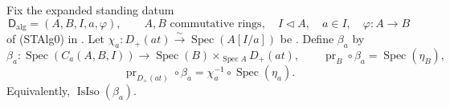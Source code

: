 \begin{lemma}
  \label{lemma:nagata-strict-transform-basechange-chart}

  Fix the expanded standing datum
  \[
    \mathsf D_{\mathrm{alg}}=(A,B,I,a,\varphi),\qquad
    A,B\text{ commutative rings},\quad
    I\triangleleft A,\quad a\in I,\quad
    \varphi\colon A\to B
  \]
  of (STAlg0) in
  .
  Let $\chi_a\colon D_+(at)\xrightarrow{\sim}
  \operatorname{Spec}(A[I/a])$ be
  .  Define $\beta_a$ by
  \[
    \beta_a\colon\operatorname{Spec}(C_a(A,B,I))
      \longrightarrow
      \operatorname{Spec}(B)\times_{\operatorname{Spec}A}D_+(at),
    \qquad
    \operatorname{pr}_B\circ\beta_a=\operatorname{Spec}(\eta_B),
  \]
  \[
    \operatorname{pr}_{D_+(at)}\circ\beta_a
      =\chi_a^{-1}\circ\operatorname{Spec}(\eta_a).
  \]
  Equivalently, $\operatorname{IsIso}(\beta_a)$.
\end{lemma}

